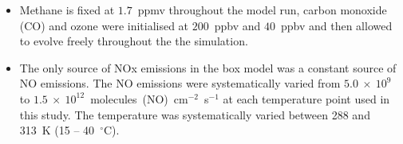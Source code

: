 \begin{itemize}
    \item Methane is fixed at $1.7$~ppmv throughout the model run, carbon monoxide (CO) and ozone were initialised at $200$~ppbv and $40$~ppbv and then allowed to evolve freely throughout the the simulation.
    \item The only source of NOx emissions in the box model was a constant source of NO emissions. The NO emissions were systematically varied from $5.0~\times~10^9$ to $1.5~\times~10^{12}$~molecules~(NO)~cm$^{-2}$~s$^{-1}$ at each temperature point used in this study. The temperature was systematically varied between 288 and 313~K (15 -- 40~$^{\circ}$C).
\end{itemize}
%        

